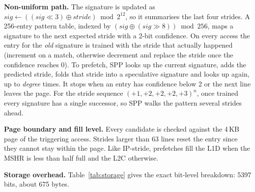 \documentclass[conference]{IEEEtran}
\begin{document}
\textbf{Non-uniform path.} The signature is updated as
$\mathit{sig} \leftarrow ((\mathit{sig}\ll 3) \oplus \mathit{stride}) \bmod 2^{12}$,
so it summarises the last four strides. A 256-entry pattern table, indexed by
$(\mathit{sig} \oplus (\mathit{sig}\gg 8)) \bmod 256$, maps a signature to the
next expected stride with a 2-bit confidence. On every access the entry for
the \emph{old} signature is trained with the stride that actually happened
(increment on a match, otherwise decrement and replace the stride once the
confidence reaches 0). To prefetch, SPP looks up the current signature,
adds the predicted stride, folds that stride into a speculative signature and
looks up again, up to \emph{degree} times. It stops when an entry has
confidence below 2 or the next line leaves the page. For the stride sequence
$(+1,+2,+2,+2,+3)^n$, once trained every signature has a single successor,
so SPP walks the pattern several strides ahead.

\textbf{Page boundary and fill level.} Every candidate is checked against the
4\,KB page of the triggering access. Strides larger than 63 lines reset the
entry since they cannot stay within the page. Like IP-stride, prefetches fill
the L1D when the MSHR is less than half full and the L2C otherwise.

\textbf{Storage overhead.} Table~\ref{tab:storage} gives the exact bit-level
breakdown: 5397 bits, about 675 bytes.
\end{document}
